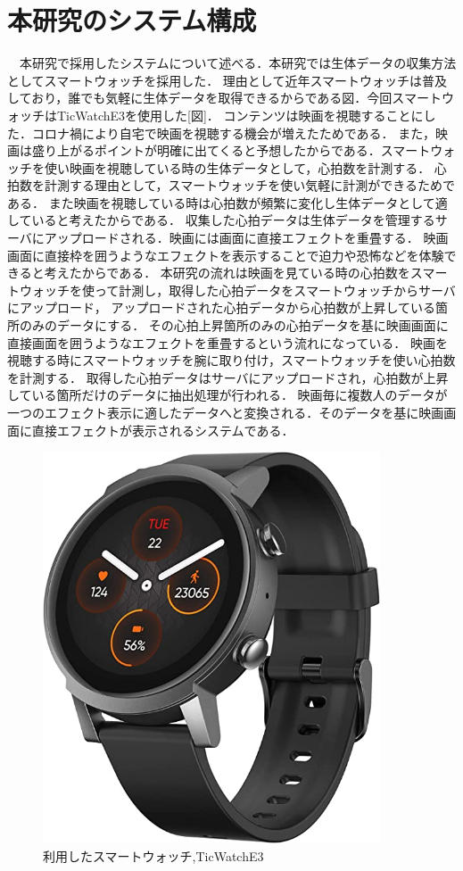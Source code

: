 \section{本研究のシステム構成}
　本研究で採用したシステムについて述べる．本研究では生体データの収集方法としてスマートウォッチを採用した．
理由として近年スマートウォッチは普及しており，誰でも気軽に生体データを取得できるからである図．今回スマートウォッチはTicWatchE3を使用した[図]．
コンテンツは映画を視聴することにした．コロナ禍により自宅で映画を視聴する機会が増えたためである．
また，映画は盛り上がるポイントが明確に出てくると予想したからである．スマートウォッチを使い映画を視聴している時の生体データとして，心拍数を計測する．
心拍数を計測する理由として，スマートウォッチを使い気軽に計測ができるためである．
また映画を視聴している時は心拍数が頻繁に変化し生体データとして適していると考えたからである．
収集した心拍データは生体データを管理するサーバにアップロードされる．映画には画面に直接エフェクトを重畳する．
映画画面に直接枠を囲うようなエフェクトを表示することで迫力や恐怖などを体験できると考えたからである．
本研究の流れは映画を見ている時の心拍数をスマートウォッチを使って計測し，取得した心拍データをスマートウォッチからサーバにアップロード，
アップロードされた心拍データから心拍数が上昇している箇所のみのデータにする．
その心拍上昇箇所のみの心拍データを基に映画画面に直接画面を囲うようなエフェクトを重畳するという流れになっている．
映画を視聴する時にスマートウォッチを腕に取り付け，スマートウォッチを使い心拍数を計測する．
取得した心拍データはサーバにアップロードされ，心拍数が上昇している箇所だけのデータに抽出処理が行われる．
映画毎に複数人のデータが一つのエフェクト表示に適したデータへと変換される．そのデータを基に映画画面に直接エフェクトが表示されるシステムである．

\begin{figure}[H]
    \centering
    \includegraphics[width=10cm]{images/chapter3/watch.jpg}
    \caption{利用したスマートウォッチ,TicWatchE3}
\end{figure}

